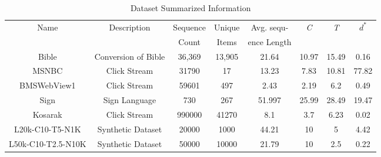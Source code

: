 \begin{table}[!htb]
\centering
\begin{tabular}{|c|c|c|c|c|c|c|c|}
\hline
Name & Description & Sequence & Unique & Avg. sequ- & \textit{C} & \textit{T} & $d^{*}$\\
& & Count & Items & ence Length & & &\\
\hline
Bible & Conversion of Bible & 36,369 & 13,905 & 21.64  &  10.97 & 15.49 & 0.16 \\
\hline
MSNBC & Click Stream & 31790 & 17 & 13.23 & 7.83 & 10.81 & 77.82\\
\hline
BMSWebView1 & Click Stream & 59601 & 497 & 2.43 & 2.19 & 6.2 & 0.49\\
\hline
Sign & Sign Language & 730 & 267  & 51.997 & 25.99 & 28.49 & 19.47\\
\hline
Kosarak & Click Stream & 990000 & 41270 & 8.1 & 3.7 & 6.23 & 0.02\\
\hline
L20k-C10-T5-N1K & Synthetic Dataset & 20000 & 1000 & 44.21 &  10 & 5 & 4.42\\
\hline
L50k-C10-T2.5-N10K  & Synthetic Dataset &  50000 & 10000  & 21.79 & 10 & 2.5 & 0.22\\
\hline
\end{tabular}
\caption{Dataset Summarized Information}
\label{table:dataset_information_summary}
\end{table}


